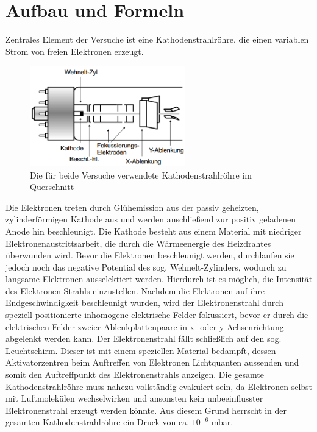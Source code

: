 \section{Aufbau und Formeln}
Zentrales Element der Versuche ist eine Kathodenstrahlröhre, die einen variablen Strom von freien Elektronen erzeugt. 

\begin{figure}[htbp]
\includegraphics[width=0.6\textwidth] {pics/Kathode.png}
\centering
\caption{Die für beide Versuche verwendete Kathodenstrahlröhre im Querschnitt}
\end{figure}

Die Elektronen treten durch Glühemission aus der passiv geheizten, zylinderförmigen Kathode aus und werden anschließend zur positiv geladenen Anode hin beschleunigt. Die Kathode besteht aus einem Material mit niedriger Elektronenaustrittsarbeit, die durch die Wärmeenergie des Heizdrahtes überwunden wird.
Bevor die Elektronen beschleunigt werden, durchlaufen sie jedoch noch das negative Potential des sog. Wehnelt-Zylinders, wodurch zu langsame Elektronen ausselektiert werden. Hierdurch ist es möglich, die Intensität des Elektronen-Strahls einzustellen.
Nachdem die Elektronen auf ihre Endgeschwindigkeit beschleunigt wurden, wird der Elektronenstrahl durch speziell positionierte inhomogene elektrische Felder fokussiert, bevor er durch die elektrischen Felder zweier Ablenkplattenpaare in x- oder y-Achsenrichtung abgelenkt werden kann.
Der Elektronenstrahl fällt schließlich auf den sog. Leuchtschirm. Dieser ist mit einem speziellen Material bedampft, dessen Aktivatorzentren beim Auftreffen von Elektronen Lichtquanten aussenden und somit den Auftreffpunkt des Elektronenstrahls anzeigen.
Die gesamte Kathodenstrahlröhre muss nahezu vollständig evakuiert sein, da Elektronen selbst mit Luftmolekülen wechselwirken und ansonsten kein unbeeinflusster Elektronenstrahl erzeugt werden könnte. Aus diesem Grund herrscht in der gesamten Kathodenstrahlröhre ein Druck von ca. $10^{-6}$ mbar.

